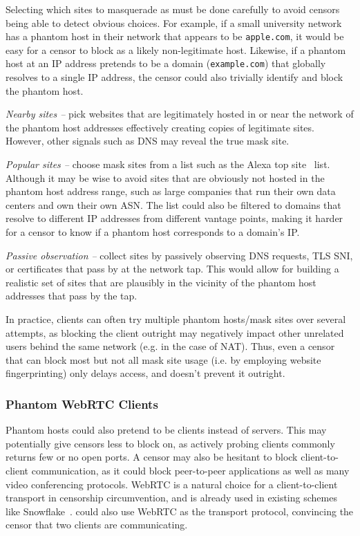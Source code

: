 \documentclass[sigconf]{acmart}
\begin{document}
Selecting which sites to masquerade as must be done carefully to avoid censors
being able to detect obvious choices. For example, if a small university network
has a phantom host in their network that appears to be \texttt{apple.com}, it
would be easy for a censor to block as a likely non-legitimate host. Likewise,
if a phantom host at an IP address pretends to be a domain (\texttt{example.com}) that
globally resolves to a single IP address, the censor could also trivially
identify and block the phantom host.

\textit{Nearby sites --} pick websites that are
legitimately hosted in or near the network of the phantom host addresses
effectively creating copies of legitimate sites. However, other signals such as 
DNS may reveal the true mask site.

\textit{Popular sites --} choose mask sites from a list such as the Alexa
top site~\cite{alexa-top500} list. Although it may be wise to avoid
sites that are obviously not hosted in the phantom host address range, such as
large companies that run their own data centers and own their own ASN.
The list could also be filtered to domains that resolve to different IP
addresses from different vantage points, making it harder for a censor to know
if a phantom host corresponds to a domain's IP.

\textit{Passive observation --} collect sites by passively observing DNS requests, TLS
SNI, or certificates that pass by at the network tap. This would allow for building a realistic set
of sites that are plausibly in the vicinity of the phantom host addresses
that pass by the tap. 

In practice, clients can often try multiple phantom hosts/mask sites over
several attempts, as blocking the client outright may negatively impact other
unrelated users behind the same network (e.g. in the case of NAT). Thus, even a
censor that can block most but not all mask site usage (i.e. by employing 
website fingerprinting) only delays access, and doesn't prevent it outright.

\subsubsection{Phantom WebRTC Clients}
\label{sec:webrtc}

Phantom hosts could also pretend to be clients instead of servers. This may
potentially give censors less to block on, as actively probing clients commonly
returns few or no open ports. A censor may also be hesitant to block
client-to-client communication, as it could block peer-to-peer applications as
well as many video conferencing protocols. WebRTC is a
natural choice for a client-to-client transport in censorship circumvention,
and is already used in existing schemes like
Snowflake~\cite{snowflake}. \scheme could also use WebRTC as the
transport protocol, convincing the censor that two clients are communicating.
\end{document}
